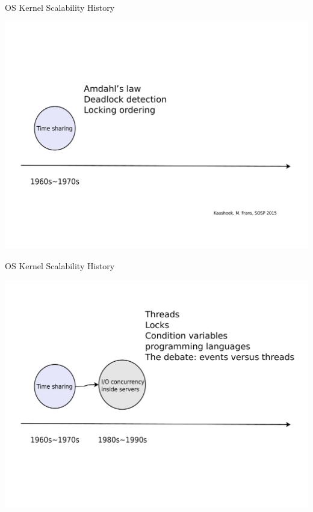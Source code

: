 \documentclass[english]{beamer} %
\begin{document}
\begin{frame}{OS Kernel Scalability History}
\begin{center}
\includegraphics[scale=0.3]{fig/history_old_60s}
\end{center}
\end{frame}


\begin{frame}{OS Kernel Scalability History}
\begin{center}
\includegraphics[scale=0.3]{fig/history_old_80s}
\end{center}
\end{frame}
\end{document}

